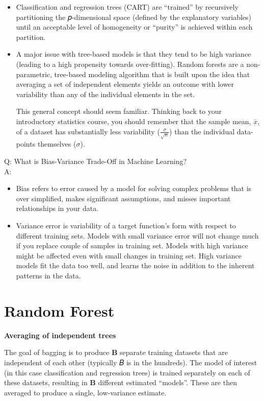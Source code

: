 \documentclass[
]{book}
\providecommand{\tightlist}{%
  \setlength{\itemsep}{0pt}\setlength{\parskip}{0pt}}
\theoremstyle{definition}
\theoremstyle{definition}
\theoremstyle{definition}
\theoremstyle{definition}
\theoremstyle{remark}
\begin{document}
\begin{itemize}
\item
  Classification and regression trees (CART) are ``trained'' by recursively partitioning the 𝑝-dimensional space (defined by the explanatory variables) until an acceptable level of homogeneity or ``purity'' is achieved within each partition.
\item
  A major issue with tree-based models is that they tend to be high variance (leading to a high propensity towards over-fitting). Random forests are a non-parametric, tree-based modeling algorithm that is built upon the idea that averaging a set of independent elements yields an outcome with lower variability than any of the individual elements in the set.

  This general concept should seem familiar. Thinking back to your introductory statistics course, you should remember that the sample mean, \(\overline{x}\), of a dataset has substantially less variability (\(\frac{\sigma}{\sqrt{n}}\)) than the individual data-points themselves (\(\sigma\)).
\end{itemize}

Q: What is Bias-Variance Trade-Off in Machine Learning?\\
A:

\begin{itemize}
\tightlist
\item
  Bias refers to error caused by a model for solving complex problems that is over simplified, makes significant assumptions, and misses important relationships in your data.
\item
  Variance error is variability of a target function's form with respect to different training sets. Models with small variance error will not change much if you replace couple of samples in training set. Models with high variance might be affected even with small changes in training set. High variance models fit the data too well, and learns the noise in addition to the inherent patterns in the data.
\end{itemize}

\section{Random Forest}\label{random-forest}

\textbf{Averaging of independent trees}

The goal of bagging is to produce \(\boldsymbol{B}\) separate training datasets that are independent of each other (typically 𝐵 is in the hundreds). The model of interest (in this case classification and regression trees) is trained separately on each of these datasets, resulting in \(\boldsymbol{B}\) different estimated ``models''. These are then averaged to produce a single, low-variance estimate.
\end{document}
